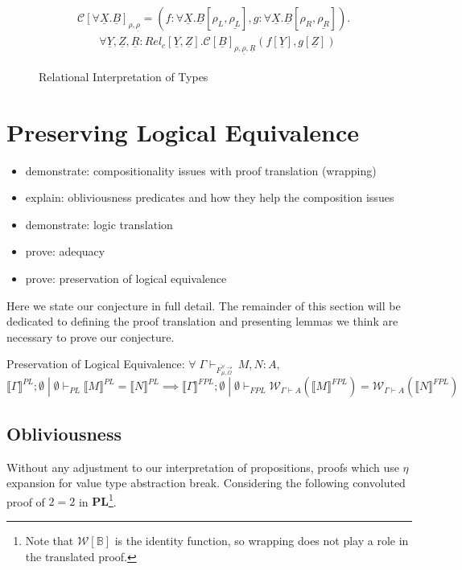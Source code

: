 \documentclass[acmsmall]{acmart}
\newcommand{\den}[1]{\llbracket #1\rrbracket}
\newcommand{\pl}{$\mathbf{PL}$}
\begin{document}
\begin{figure}[H]
\begin{align*}
    \\
    &\mathcal{C}[\forall \underline{X}.\underline{B}]_{\rho,\underline{\rho}} = (f : \forall \underline{X}.\underline{B}[\rho_L,\underline{\rho_L}],g : \forall \underline{X}.\underline{B}[\rho_R,\underline{\rho_R}]). \\&\;\;\;\;\;\;\;
    \forall \underline{Y},\underline{Z},\underline{R}:Rel_c[\underline{Y},\underline{Z}]. \mathcal{C}[\underline{B}]_{\rho,\underline{\rho},\underline{R}}(f[\underline{Y}],g[\underline{Z}])
    \end{align*}
    \caption{Relational Interpretation of Types}
  \label{fig:RelInterp}
\end{figure}


\section{Preserving Logical Equivalence}\label{sec:LogicEquiv}
\begin{itemize}
  \item demonstrate: compositionality issues with proof translation (wrapping)
  \item explain: obliviousness predicates and how they help the composition issues
  \item demonstrate: logic translation
  \item prove: adequacy
  \item prove: preservation of logical equivalence
\end{itemize}

Here we state our conjecture in full detail. The remainder of this section will be dedicated to defining the proof translation and presenting lemmas we think are necessary to prove our conjecture.
\begin{conjecture} 
Preservation of Logical Equivalence: $\forall\; \Gamma \vdash_{F_{\mu,\Omega}^{\forall \to}} M,N : A,$
\[
  \den{\Gamma}^{PL} ; \emptyset \;|\; \emptyset \vdash_{PL} \den{M}^{PL} = \den{N}^{PL} \implies \den{\Gamma}^{FPL}; \emptyset \;|\; \emptyset \vdash_{FPL} \mathcal{W}_{\Gamma \vdash A}(\den{M}^{FPL}) = \mathcal{W}_{\Gamma \vdash A}(\den{N}^{FPL})
\]
\end{conjecture}

\subsection{Obliviousness}
Without any adjustment to our interpretation of propositions, proofs which use $\eta$ expansion for value type abstraction break. Considering the following convoluted proof of $2=2$ in \pl\footnote{Note that $\mathcal{W}[\mathbb{B}]$ is the identity function, so wrapping does not play a role in the translated proof.}.
\end{document}

